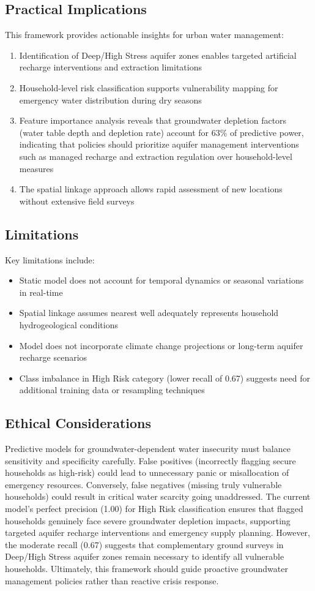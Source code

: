 \documentclass[conference]{IEEEtran}
\begin{document}
\subsection{Practical Implications}
This framework provides actionable insights for urban water management:
\begin{enumerate}
\item Identification of Deep/High Stress aquifer zones enables targeted artificial recharge interventions and extraction limitations
\item Household-level risk classification supports vulnerability mapping for emergency water distribution during dry seasons
\item Feature importance analysis reveals that groundwater depletion factors (water table depth and depletion rate) account for 63\% of predictive power, indicating that policies should prioritize aquifer management interventions such as managed recharge and extraction regulation over household-level measures
\item The spatial linkage approach allows rapid assessment of new locations without extensive field surveys
\end{enumerate}

\subsection{Limitations}
Key limitations include:
\begin{itemize}
\item Static model does not account for temporal dynamics or seasonal variations in real-time
\item Spatial linkage assumes nearest well adequately represents household hydrogeological conditions
\item Model does not incorporate climate change projections or long-term aquifer recharge scenarios
\item Class imbalance in High Risk category (lower recall of 0.67) suggests need for additional training data or resampling techniques
\end{itemize}

\subsection{Ethical Considerations}
Predictive models for groundwater-dependent water insecurity must balance sensitivity and specificity carefully. False positives (incorrectly flagging secure households as high-risk) could lead to unnecessary panic or misallocation of emergency resources. Conversely, false negatives (missing truly vulnerable households) could result in critical water scarcity going unaddressed. The current model's perfect precision (1.00) for High Risk classification ensures that flagged households genuinely face severe groundwater depletion impacts, supporting targeted aquifer recharge interventions and emergency supply planning. However, the moderate recall (0.67) suggests that complementary ground surveys in Deep/High Stress aquifer zones remain necessary to identify all vulnerable households. Ultimately, this framework should guide proactive groundwater management policies rather than reactive crisis response.
\end{document}
